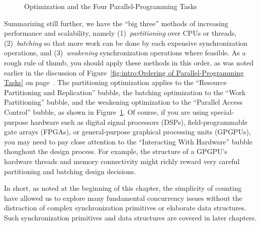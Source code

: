 \begin{figure}[tb]
\begin{center}
\end{center}
\caption{Optimization and the Four Parallel-Programming Tasks}
\label{fig:count:Optimization and the Four Parallel-Programming Tasks}
\end{figure}

Summarizing still further, we have the ``big three'' methods of
increasing performance and scalability, namely
(1)~\emph{partitioning} over CPUs or threads,
(2)~\emph{batching} so that more work can be done by each expensive
synchronization operations, and
(3)~\emph{weakening} synchronization operations where feasible.
As a rough rule of thumb, you should apply these methods in this order,
as was noted earlier in the discussion of
Figure~\ref{fig:intro:Ordering of Parallel-Programming Tasks}
on
page~\pageref{fig:intro:Ordering of Parallel-Programming Tasks}.
The partitioning optimization applies to the
``Resource Partitioning and Replication'' bubble,
the batching optimization to the ``Work Partitioning'' bubble,
and the weakening optimization to the ``Parallel Access Control'' bubble,
as shown in
Figure~\ref{fig:count:Optimization and the Four Parallel-Programming Tasks}.
Of course, if you are using special-purpose hardware such as
digital signal processors (DSPs), field-programmable gate arrays (FPGAs),
or general-purpose graphical processing units (GPGPUs), you may need
to pay close attention to the ``Interacting With Hardware'' bubble
thoughout the design process.
For example, the structure of a GPGPU's hardware threads and memory
connectivity might richly reward very careful partitioning
and batching design decisions.

In short, as noted at the beginning of this chapter, the simplicity
of counting have allowed us to explore many
fundamental concurrency issues without the distraction of
complex synchronization primitives or elaborate data structures.
Such synchronization primitives and data structures are covered
in later chapters.
